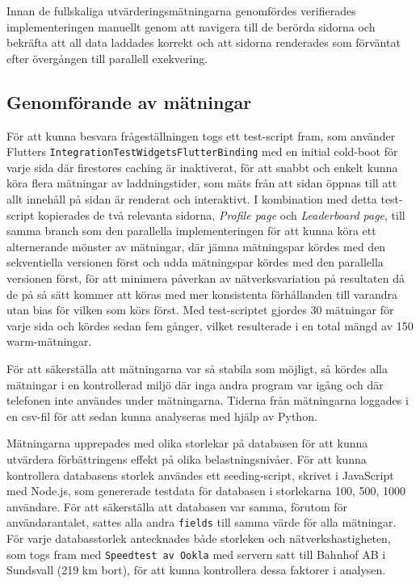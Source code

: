\documentclass[letterpaper,twocolumn,10pt]{article}
\begin{document}
Innan de fullskaliga utvärderingsmätningarna genomfördes verifierades 
implementeringen manuellt genom att navigera till de berörda sidorna och 
bekräfta att all data laddades korrekt och att sidorna renderades som förväntat 
efter övergången till parallell exekvering.

\subsection{Genomförande av mätningar}

För att kunna besvara frågeställningen togs ett test-script fram, som använder
Flutters \texttt{IntegrationTest\allowbreak Widgets\allowbreak Flutter\allowbreak Binding} med en initial cold-boot
för varje sida där firestores caching är inaktiverat, för att snabbt och
enkelt kunna köra flera mätningar av laddningstider, som mäts från att sidan
öppnas till att allt innehåll på sidan är renderat och interaktivt. I
kombination med detta test-script kopierades de två relevanta sidorna,
\textit{Profile page} och \textit{Leaderboard page}, till samma branch som den
parallella implementeringen för att kunna köra ett alternerande mönster av
mätningar, där jämna mätningspar kördes med den sekventiella versionen först och
udda mätningspar kördes med den parallella versionen först, för att minimera
påverkan av nätverksvariation på resultaten då de på så sätt kommer att köras
med mer konsistenta förhållanden till varandra utan bias för vilken som körs
först. Med test-scriptet gjordes 30 mätningar för varje sida och kördes sedan
fem gånger, vilket resulterade i en total mängd av 150 warm-mätningar.

För att säkerställa att mätningarna var så stabila som möjligt, så kördes alla
mätningar i en kontrollerad miljö där inga andra program var igång och där
telefonen inte användes under mätningarna. Tiderna från mätningarna loggades i
en csv-fil för att sedan kunna analyseras med hjälp av Python. 

Mätningarna upprepades med olika storlekar på databasen för att kunna
utvärdera förbättringens effekt på olika belastningsnivåer. För att kunna
kontrollera databasens storlek användes ett seeding-script, skrivet i JavaScript
med Node.js, som genererade testdata för databasen i storlekarna 100, 500, 1000
användare. För att säkerställa att databasen var samma, förutom för
användarantalet, sattes alla andra \texttt{fields} till samma värde för alla mätningar.
För varje databasstorlek antecknades både storleken och nätverkshastigheten, som
togs fram med \texttt{Speedtest av Ookla} med servern satt till Bahnhof AB i
Sundsvall (219 km bort), för
att kunna kontrollera dessa faktorer i analysen.
\end{document}
